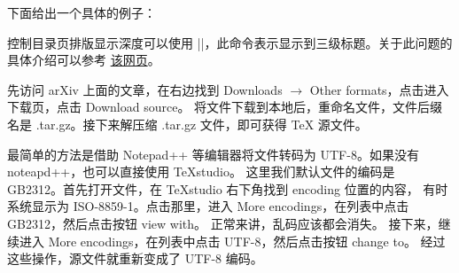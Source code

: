 下面给出一个具体的例子：


控制目录页排版显示深度可以使用 |\setcounter{tocdepth}{2}|，此命令表示显示到三级标题。关于此问题的具体介绍可以参考
\href{https://blog.csdn.net/RobertChenGuangzhi/article/details/50480856}{该网页}。


先访问 arXiv 上面的文章，在右边找到 Downloads $\rightarrow$ Other formats，点击进入下载页，点击 Download source。
将文件下载到本地后，重命名文件，文件后缀名是 .tar.gz。接下来解压缩 .tar.gz 文件，即可获得 \TeX{} 源文件。



最简单的方法是借助 Notepad++ 等编辑器将文件转码为 UTF-8。如果没有 noteapd++，也可以直接使用 TeXstudio。
这里我们默认文件的编码是 GB2312。首先打开文件，在 TeXstudio 右下角找到 encoding 位置的内容，
有时系统显示为 ISO-8859-1。点击那里，进入 More encodings，在列表中点击 GB2312，然后点击按钮 view with。
正常来讲，乱码应该都会消失。 接下来，继续进入 More encodings，在列表中点击 UTF-8，然后点击按钮 change to。
经过这些操作，源文件就重新变成了 UTF-8 编码。


